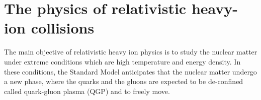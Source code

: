 \section{The physics of relativistic heavy-ion collisions}

The main objective of relativistic heavy ion physics is to study the nuclear matter under extreme conditions which are high temperature and energy density. In these conditions, the Standard Model anticipates that the nuclear matter undergo a new phase, where the quarks and the gluons are expected to be de-confined called quark-gluon plasma (QGP) and to freely move. %






